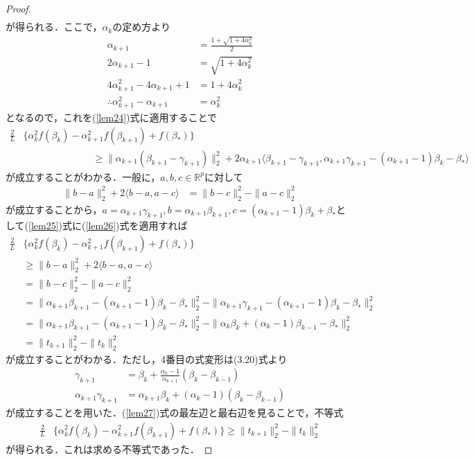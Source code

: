 \documentclass{jsarticle}
\theoremstyle{definition}
\theoremstyle{mystyle} %
\begin{document}
\begin{proof}
\begin{equation}
\begin{split}
\end{split}
\end{equation}
が得られる．ここで，$\alpha_{k}$の定め方より
\begin{align*}
\alpha_{k+1}&=\frac{1+\sqrt{1+4\alpha_k^2}}{2}\\
2\alpha_{k+1}-1&=\sqrt{1+4\alpha_k^2}\\
4\alpha_{k+1}^2-4\alpha_{k+1}+1&=1+4\alpha_k^2\\
\therefore \alpha_{k+1}^2-\alpha_{k+1}&=\alpha_k^2
\end{align*}
となるので，これを(\ref{lem24})式に適用することで
\begin{equation}
\begin{split}
\label{lem25}
\frac{2}{L}&\{\alpha_k^2f(\beta_k)-\alpha_{k+1}^2f(\beta_{k+1})+f(\beta_{\ast})\}\\
&\hspace{3cm}\geq \|\alpha_{k+1}(\beta_{k+1}-\gamma_{k+1})\|_2^2+2\alpha_{k+1}\langle \beta_{k+1}-\gamma_{k+1},\alpha_{k+1}\gamma_{k+1}-(\alpha_{k+1}-1)\beta_k-\beta_{\ast} \rangle
\end{split}
\end{equation}
が成立することがわかる．一般に，$a,b,c\in \mathbb{R}^p$に対して
\begin{align}
\label{lem26}
\|b-a\|_2^2+2\langle b-a,a-c \rangle&=\|b-c\|_2^2-\|a-c\|_2^2
\end{align}
が成立することから，$a=\alpha_{k+1}\gamma_{k+1},b=\alpha_{k+1}\beta_{k+1},c=(\alpha_{k+1}-1)\beta_k+\beta_{\ast}$として(\ref{lem25})式に(\ref{lem26})式を適用すれば
\begin{align*}
\frac{2}{L}&\{\alpha_k^2f(\beta_k)-\alpha_{k+1}^2f(\beta_{k+1})+f(\beta_{\ast})\}\\
&\geq \|b-a\|_2^2+2\langle  b-a,a-c  \rangle\\
&=\|b-c\|_2^2-\|a-c\|_2^2\\
&=\|\alpha_{k+1}\beta_{k+1}-(\alpha_{k+1}-1)\beta_k-\beta_{\ast}\|_2^2-\|\alpha_{k+1}\gamma_{k+1}-(\alpha_{k+1}-1)\beta_k-\beta_{\ast}\|_2^2\\
&=\|\alpha_{k+1}\beta_{k+1}-(\alpha_{k+1}-1)\beta_k-\beta_{\ast}\|_2^2-\|\alpha_k \beta_k+(\alpha_k-1)\beta_{k-1}-\beta_{\ast}\|_2^2\\
&=\|t_{k+1}\|_2^2-\|t_k\|_2^2
\end{align*}
が成立することがわかる．ただし，4番目の式変形は(3.20)式より
\begin{equation}
\begin{split}
\label{lem27}
\gamma_{k+1}&=\beta_k+\frac{\alpha_k-1}{\alpha_{k+1}}(\beta_k-\beta_{k-1})\\
\alpha_{k+1}\gamma_{k+1}&=\alpha_{k+1}\beta_k+(\alpha_k-1)(\beta_k-\beta_{k-1})
\end{split}
\end{equation}
が成立することを用いた．(\ref{lem27})式の最左辺と最右辺を見ることで，不等式
\begin{align*}
\frac{2}{L}&\{\alpha_k^2f(\beta_k)-\alpha_{k+1}^2f(\beta_{k+1})+f(\beta_{\ast})\}\geq \|t_{k+1}\|_2^2-\|t_k\|_2^2
\end{align*}
が得られる．これは求める不等式であった．
\end{proof}
\end{document}
